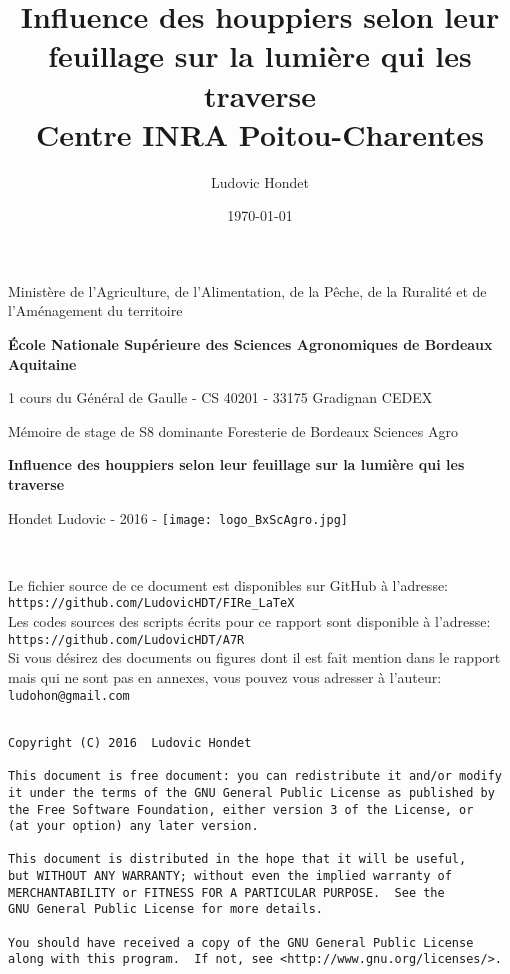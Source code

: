 \documentclass[12pt]{report}
\title{Influence des houppiers selon leur feuillage sur la lumière qui les traverse\\
\normalsize{Centre INRA Poitou-Charentes}}
\author{Ludovic Hondet}
\date{\today}
\begin{document}
\begin{titlepage}    
    \centering
    {\LARGE Ministère de l'Agriculture, de l'Alimentation,
    de la Pêche, de la Ruralité et de l'Aménagement du territoire \par}
    \vspace{6mm}
    {\huge \textbf{École Nationale Supérieure des Sciences Agronomiques de Bordeaux
    Aquitaine} \par}
    \vspace{3mm}
    {\normalsize 1 cours du Général de Gaulle - CS 40201 - 33175 Gradignan CEDEX \par}
    \vspace{15mm}
    {\LARGE Mémoire de stage de S8 dominante Foresterie de Bordeaux Sciences Agro \par}
    \vspace{15mm}
    {\LARGE \textbf{Influence des houppiers selon leur feuillage sur la lumière qui les traverse} \par}
    
    \vfill
    
    {\Large{Hondet Ludovic} \hfill \Large{- 2016 -} \hfill \texttt{[image: logo\_BxScAgro.jpg]}}
\end{titlepage}

\newpage
\thispagestyle{empty}
~
\newpage



\maketitle

\newpage
\thispagestyle{empty}
\setcounter{page}{0}
\noindent Le fichier source de ce document est disponibles sur GitHub à l'adresse:\\
\verb?https://github.com/LudovicHDT/FIRe_LaTeX?\\
\noindent Les codes sources des scripts écrits pour ce rapport sont disponible à l'adresse:\\
\verb?https://github.com/LudovicHDT/A7R?\\
Si vous désirez des documents ou figures dont il est fait mention dans le rapport mais qui
ne sont pas en annexes, vous pouvez vous adresser à l'auteur:\\
\verb?ludohon@gmail.com?

{\footnotesize
\begin{verbatim}

Copyright (C) 2016  Ludovic Hondet

This document is free document: you can redistribute it and/or modify
it under the terms of the GNU General Public License as published by
the Free Software Foundation, either version 3 of the License, or
(at your option) any later version.

This document is distributed in the hope that it will be useful,
but WITHOUT ANY WARRANTY; without even the implied warranty of
MERCHANTABILITY or FITNESS FOR A PARTICULAR PURPOSE.  See the
GNU General Public License for more details.

You should have received a copy of the GNU General Public License
along with this program.  If not, see <http://www.gnu.org/licenses/>.
\end{verbatim}
}
\newpage
\end{document}
